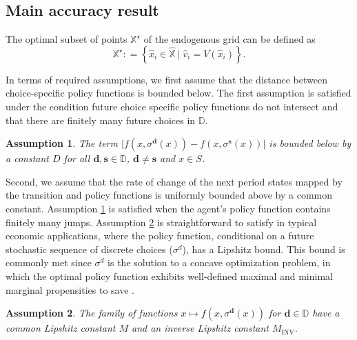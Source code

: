\documentclass[12pt]{article}
\newtheorem{ass}{Assumption}
\newcommand{\DChSet}{\mathbb{D}}
\newcommand{\dVecVar}{\mathbf{d}}
\newcommand{\sVecVar}{\mathbf{s}}
\begin{document}

\newpage

\subsection{Main accuracy result}


The optimal subset of points $\mathbb{X}^{\star}$ of the endogenous grid can be defined as
%
\begin{equation}
\mathbb{X}^{\star}\colon = \left\{\hat{x}_{i}\in \hat{\mathbb{X}}\,\big\vert \,\, \hat{v}_{i} = V(\hat{x}_{i})\right\}.
\end{equation}
%

In terms of required assumptions, we first assume that the distance between choice-specific policy functions is bounded below. The first assumption is satisfied under the condition future choice specific policy functions do not intersect and that there are finitely many future choices in $\DChSet$. 
%
\begin{ass}\label{ass: jump_size}
The term $\vert f(x,\sigma^{\dVecVar}(x)) - f(x,\sigma^{\sVecVar}(x))\vert$ is bounded below by a constant $D$ for all $\dVecVar,\sVecVar\in \DChSet$, $\dVecVar\not = \sVecVar$ and $x\in S$. 
\end{ass}
%
Second, we assume that the rate of change of the next period states mapped by the transition and policy functions is uniformly bounded above by a common constant. Assumption \ref{ass: jump_size} is satisfied when the agent's policy function contains finitely many jumps. Assumption \ref{ass: lipshitz} is straightforward to satisfy in typical economic applications, where the policy function, conditional on a future stochastic sequence of discrete choices ($\sigma^{d}$), has a Lipshitz bound. This bound is commonly met since $\sigma^{d}$ is the solution to a concave optimization problem, in which the optimal policy function exhibits well-defined maximal and minimal marginal propensities to save \citep{Carroll2023}. 
%

\begin{ass}\label{ass: lipshitz}
The family of functions $x\mapsto f(x,\sigma^{\dVecVar}(x))$ for $\dVecVar\in \DChSet$ have a common Lipshitz constant $M$ and an inverse Lipshitz constant $M_{\text{INV}}$.
\end{ass}
\end{document}
